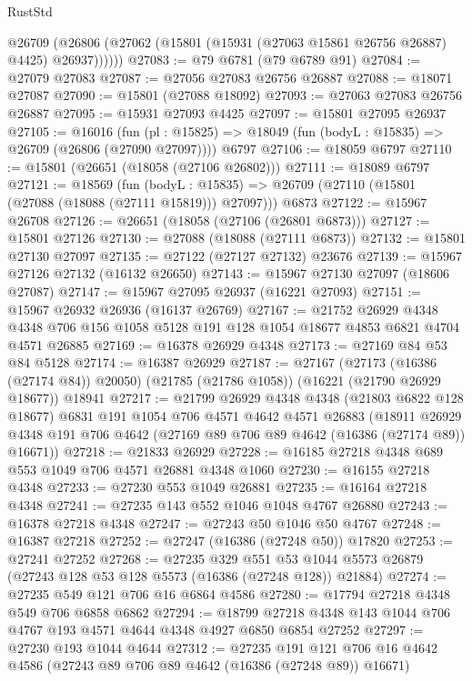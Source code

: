 \begin{lexlean}{RustStd}
\begin{coremodule}
        @26709 (@26806 (@27062 (@15801 (@15931 (@27063 @15861 @26756 @26887) @4425) @26937))))))
@27083 := @79 @6781 (@79 @6789 @91)
@27084 := @27079 @27083
@27087 := @27056 @27083 @26756 @26887
@27088 := @18071 @27087
@27090 := @15801 (@27088 @18092)
@27093 := @27063 @27083 @26756 @26887
@27095 := @15931 @27093 @4425
@27097 := @15801 @27095 @26937
@27105 := @16016
    (fun (pl : @15825) => @18049 (fun (bodyL : @15835) => @26709 (@26806 (@27090 @27097))))
    @6797
@27106 := @18059 @6797
@27110 := @15801 (@26651 (@18058 (@27106 @26802)))
@27111 := @18089 @6797
@27121 := @18569
    (fun (bodyL : @15835) => @26709 (@27110 (@15801 (@27088 (@18088 (@27111 @15819))) @27097)))
    @6873
@27122 := @15967 @26708
@27126 := @26651 (@18058 (@27106 (@26801 @6873)))
@27127 := @15801 @27126
@27130 := @27088 (@18088 (@27111 @6873))
@27132 := @15801 @27130 @27097
@27135 := @27122 (@27127 @27132) @23676
@27139 := @15967 @27126 @27132 (@16132 @26650)
@27143 := @15967 @27130 @27097 (@18606 @27087)
@27147 := @15967 @27095 @26937 (@16221 @27093)
@27151 := @15967 @26932 @26936 (@16137 @26769)
@27167 := @21752
    @26929
    @4348
    @4348
    @706
    @156
    @1058
    @5128
    @191
    @128
    @1054
    @18677
    @4853
    @6821
    @4704
    @4571
    @26885
@27169 := @16378 @26929 @4348
@27173 := @27169 @84 @53 @84 @5128
@27174 := @16387 @26929
@27187 := @27167
    (@27173 (@16386 (@27174 @84)) @20050)
    (@21785 (@21786 @1058))
    (@16221 (@21790 @26929 @18677))
    @18941
@27217 := @21799
    @26929
    @4348
    @4348
    (@21803 @6822 @128 @18677)
    @6831
    @191
    @1054
    @706
    @4571
    @4642
    @4571
    @26883
    (@18911 @26929 @4348 @191 @706 @4642 (@27169 @89 @706 @89 @4642 (@16386 (@27174 @89)) @16671))
@27218 := @21833 @26929
@27228 := @16185 @27218 @4348 @689 @553 @1049 @706 @4571 @26881 @4348 @1060
@27230 := @16155 @27218 @4348
@27233 := @27230 @553 @1049 @26881
@27235 := @16164 @27218 @4348
@27241 := @27235 @143 @552 @1046 @1048 @4767 @26880
@27243 := @16378 @27218 @4348
@27247 := @27243 @50 @1046 @50 @4767
@27248 := @16387 @27218
@27252 := @27247 (@16386 (@27248 @50)) @17820
@27253 := @27241 @27252
@27268 := @27235
    @329
    @551
    @53
    @1044
    @5573
    @26879
    (@27243 @128 @53 @128 @5573 (@16386 (@27248 @128)) @21884)
@27274 := @27235 @549 @121 @706 @16 @6864 @4586
@27280 := @17794 @27218 @4348 @549 @706 @6858 @6862
@27294 := @18799 @27218 @4348 @143 @1044 @706 @4767 @193 @4571 @4644 @4348 @4927 @6850 @6854 @27252
@27297 := @27230 @193 @1044 @4644
@27312 := @27235
    @191
    @121
    @706
    @16
    @4642
    @4586
    (@27243 @89 @706 @89 @4642 (@16386 (@27248 @89)) @16671)

\end{coremodule}
\end{lexlean}
